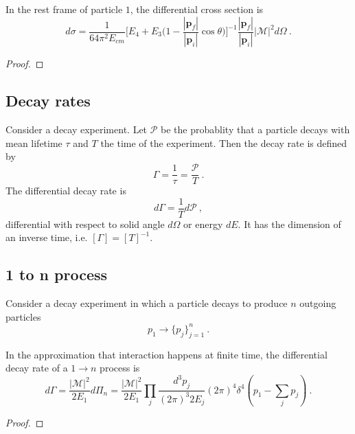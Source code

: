 \documentclass[a4paper]{article}
\begin{document}
    In the rest frame of particle $1$, the differential cross section is 
    \begin{equation*}
        d \sigma = \frac{1}{64 \pi^2 E_{cm}} \Big [ E_4 + E_3 \Big ( 1 - \frac{|\mathbf p_f|}{|\mathbf p_i|} \cos \theta \Big ) \Big ]^{-1} \frac{|\mathbf p_f|}{|\mathbf p_i|} |\mathcal M|^2 d\Omega ~.
    \end{equation*}
    \begin{proof}
        
    \end{proof}

\subsection{Decay rates}

    \begin{definition}
        Consider a decay experiment. Let $\mathcal P$ be the probablity that a particle decays with mean lifetime $\tau$ and $T$ the time of the experiment. Then the decay rate is defined by 
        \begin{equation*}
            \Gamma = \frac{1}{\tau} = \frac{\mathcal P}{T} ~.
        \end{equation*}
        The differential decay rate is 
        \begin{equation*}
            d \Gamma = \frac{1}{T} d \mathcal P~,
        \end{equation*}
        differential with respect to solid angle $d\Omega$ or energy $dE$. It has the dimension of an inverse time, i.e. $[\Gamma] = [T]^{-1}$. 
    \end{definition}

\subsection{1 to n process}

    Consider a decay experiment in which a particle decays to produce $n$ outgoing particles
    \begin{equation*}
        p_1 \rightarrow \{p_j\}_{j = 1}^n ~.
    \end{equation*}

    \begin{theorem}
        In the approximation that interaction happens at finite time, the differential decay rate of a $1 \rightarrow n$ process is 
        \begin{equation*}
            d \Gamma = \frac{|\mathcal M|^2}{2 E_1}  d\Pi_n = \frac{|\mathcal M|^2}{2 E_1}  \prod_j \frac{d^3 p_j}{(2\pi)^3 2 E_j} (2\pi)^4 \delta^4 (p_1 - {\textstyle \sum_j} p_j)~.
        \end{equation*}
    \end{theorem}
    \begin{proof}
        
    \end{proof}
\end{document}

